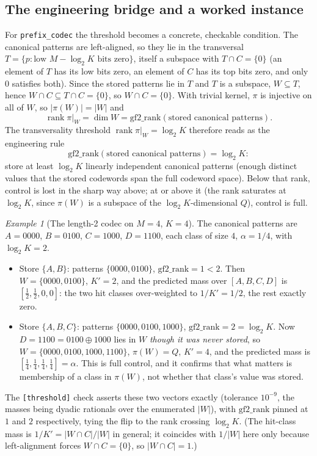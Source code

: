 \documentclass[11pt]{article}
\theoremstyle{definition}
\theoremstyle{plain}
\theoremstyle{remark}
\newtheorem{example}{Example}[section]
\DeclareMathOperator{\rank}{rank}
\newcommand{\W}{W}                          %
\newcommand{\proj}{\pi}                     %
\newcommand{\Quot}{Q}                       %
\newcommand{\al}{\alpha}                    %
\newcommand{\inter}{\cap}
\begin{document}
\subsection{The engineering bridge and a worked instance}

For \texttt{prefix\_codec} the threshold becomes a concrete, checkable condition. The
canonical patterns are left-aligned, so they lie in the transversal
$T = \{p : \text{low } M - \log_2 K \text{ bits zero}\}$, itself a subspace with
$T \inter C = \{0\}$ (an element of $T$ has its low bits zero, an element of $C$ has its
top bits zero, and only $0$ satisfies both). Since the stored patterns lie in $T$ and
$T$ is a subspace, $\W \subseteq T$, hence $\W \inter C \subseteq T \inter C = \{0\}$,
so $\W \inter C = \{0\}$. With trivial kernel, $\proj$ is injective on all of $\W$, so
$|\proj(\W)| = |\W|$ and
\begin{equation}
  \rank \proj|_{\W} = \dim \W = \mathrm{gf2\_rank}(\text{stored canonical patterns}).
  \label{eq:bridge}
\end{equation}
The transversality threshold $\rank \proj|_{\W} = \log_2 K$ therefore reads as the
engineering rule
\[
  \mathrm{gf2\_rank}(\text{stored canonical patterns}) = \log_2 K:
\]
store at least $\log_2 K$ linearly independent canonical patterns (enough distinct
values that the stored codewords span the full codeword space). Below that rank,
control is lost in the sharp way above; at or above it (the rank saturates at $\log_2 K$,
since $\proj(\W)$ is a subspace of the $\log_2 K$-dimensional $\Quot$), control is full.

\begin{example}[The length-2 codec on $M = 4$, $K = 4$]
\label{ex:m4}
The canonical patterns are $A = 0000$, $B = 0100$, $C = 1000$, $D = 1100$, each class of
size $4$, $\al = 1/4$, with $\log_2 K = 2$.
\begin{itemize}
  \item Store $\{A, B\}$: patterns $\{0000, 0100\}$, $\mathrm{gf2\_rank} = 1 < 2$. Then
  $\W = \{0000, 0100\}$, $K' = 2$, and the predicted mass over $[A,B,C,D]$ is
  $[\tfrac12, \tfrac12, 0, 0]$: the two hit classes over-weighted to $1/K' = 1/2$, the
  rest exactly zero.
  \item Store $\{A, B, C\}$: patterns $\{0000, 0100, 1000\}$, $\mathrm{gf2\_rank} = 2 =
  \log_2 K$. Now $D = 1100 = 0100 \oplus 1000$ lies in $\W$ \emph{though it was never
  stored}, so $\W = \{0000, 0100, 1000, 1100\}$, $\proj(\W) = \Quot$, $K' = 4$, and the
  predicted mass is $[\tfrac14, \tfrac14, \tfrac14, \tfrac14] = \al$. This is full
  control, and it confirms that what matters is membership of a class in $\proj(\W)$, not
  whether that class's value was stored.
\end{itemize}
The \texttt{[threshold]} check asserts these two vectors exactly (tolerance $10^{-9}$,
the masses being dyadic rationals over the enumerated $|\W|$), with $\mathrm{gf2\_rank}$
pinned at $1$ and $2$ respectively, tying the flip to the rank crossing $\log_2 K$. (The
hit-class mass is $1/K' = |\W \inter C|/|\W|$ in general; it coincides with $1/|\W|$ here
only because left-alignment forces $\W \inter C = \{0\}$, so $|\W \inter C| = 1$.)
\end{example}
\end{document}

